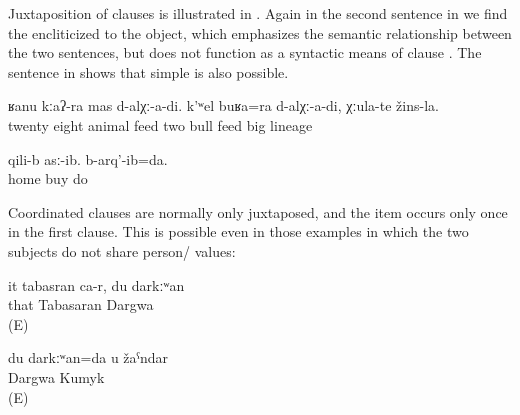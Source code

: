 Juxtaposition of clauses is illustrated in . Again in the second sentence in  we find the   encliticized to the object, which emphasizes the semantic relationship between the two sentences, but does not function as a syntactic means of clause . The sentence in  shows that simple  is also possible.
%
\begin{exe}
	\ex	\label{ex:We fed 28 animals, and we also fed two good (lit. big) breeding bulls.}
	\gll	ʁanu	kːaʔ-ra	mas	d-alχː-a-di.	k'ʷel	buʁa=ra d-alχː-a-di,	χːula-te	žins-la.\\
		twenty	eight	animal	feed two	bull	feed	big 	lineage\\
	\glt	{}

	\ex	\label{ex:‎They bought (the medicine) at home and I did (the cure)}
	\gll	qili-b	asː-ib.	b-arq'-ib=da.\\
		home	buy	do\\
	\glt	{} %
\end{exe}

Coordinated  clauses are normally only juxtaposed, and the  item occurs only once in the first clause. This is possible even in those examples in which the two  subjects do not share person/ values:
%
\begin{exe}
	\ex	\label{ex:‎‎She is Tabasaran, I (am) Dargwa}
	\gll	it	tabasran	ca-r,		du	darkːʷan\\
		that	Tabasaran			Dargwa\\
	\glt	{} (E)

	\ex	\label{ex:‎‎I am Dargwa, you (are) Kumyk}
	\gll	du	darkːʷan=da		u	žaˁndar\\
			Dargwa			Kumyk\\
	\glt	{} (E)
\end{exe}

